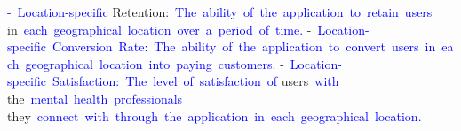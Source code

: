 \begin{tcolorbox}[colframe=gray!70!black,colback=white, title=Sample 6]
{}\textcolor{blue}{-}\textcolor{blue}{~Location}\textcolor{blue}{-specific} Retention:\textcolor{blue}{~The}\textcolor{blue}{~ability}\textcolor{blue}{~of}\textcolor{blue}{~the}\textcolor{blue}{~application}\textcolor{blue}{~to}\textcolor{blue}{~retain}\textcolor{blue}{~users} in\textcolor{blue}{~each}\textcolor{blue}{~geographical}\textcolor{blue}{~location}\textcolor{blue}{~over}\textcolor{blue}{~a}\textcolor{blue}{~period}\textcolor{blue}{~of}\textcolor{blue}{~time}\textcolor{blue}{.
}-\textcolor{blue}{~Location}\textcolor{blue}{-specific}\textcolor{blue}{~Conversion}\textcolor{blue}{~Rate}\textcolor{blue}{:}\textcolor{blue}{~The}\textcolor{blue}{~ability}\textcolor{blue}{~of}\textcolor{blue}{~the}\textcolor{blue}{~application}\textcolor{blue}{~to}\textcolor{blue}{~convert}\textcolor{blue}{~users}\textcolor{blue}{~in}\textcolor{blue}{~each}\textcolor{blue}{~geographical}\textcolor{blue}{~location}\textcolor{blue}{~into}\textcolor{blue}{~paying}\textcolor{blue}{~customers}\textcolor{blue}{.
}-\textcolor{blue}{~Location}\textcolor{blue}{-specific}\textcolor{blue}{~Satisfaction}\textcolor{blue}{:}\textcolor{blue}{~The}\textcolor{blue}{~level}\textcolor{blue}{~of}\textcolor{blue}{~satisfaction}\textcolor{blue}{~of} users\textcolor{blue}{~with} the\textcolor{blue}{~mental}\textcolor{blue}{~health}\textcolor{blue}{~professionals} they\textcolor{blue}{~connect}\textcolor{blue}{~with}\textcolor{blue}{~through}\textcolor{blue}{~the}\textcolor{blue}{~application}\textcolor{blue}{~in}\textcolor{blue}{~each}\textcolor{blue}{~geographical}\textcolor{blue}{~location}\textcolor{blue}{.
}
\end{tcolorbox}

